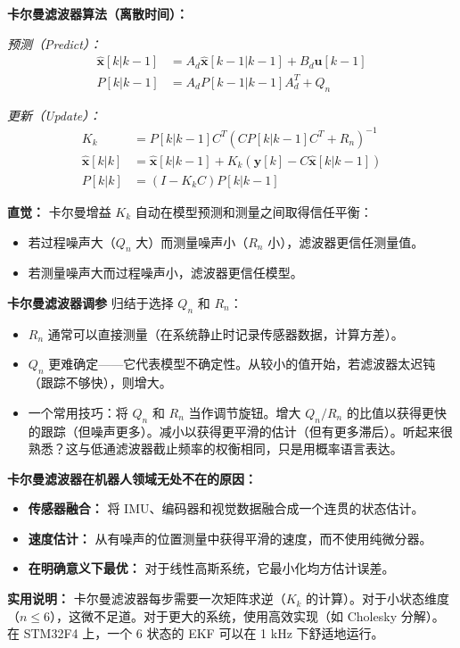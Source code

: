 \textbf{卡尔曼滤波器算法（离散时间）：}

\textit{预测（Predict）：}
\begin{align}
\hat{\mathbf{x}}[k|k-1] &= A_d \hat{\mathbf{x}}[k-1|k-1] + B_d \mathbf{u}[k-1] \\
P[k|k-1] &= A_d P[k-1|k-1] A_d^T + Q_n
\end{align}

\textit{更新（Update）：}
\begin{align}
K_k &= P[k|k-1] C^T (C P[k|k-1] C^T + R_n)^{-1} \\
\hat{\mathbf{x}}[k|k] &= \hat{\mathbf{x}}[k|k-1] + K_k (\mathbf{y}[k] - C \hat{\mathbf{x}}[k|k-1]) \\
P[k|k] &= (I - K_k C) P[k|k-1]
\end{align}

\textbf{直觉：} 卡尔曼增益 $K_k$ 自动在模型预测和测量之间取得信任平衡：
\begin{itemize}
    \item 若过程噪声大（$Q_n$ 大）而测量噪声小（$R_n$ 小），滤波器更信任测量值。
    \item 若测量噪声大而过程噪声小，滤波器更信任模型。
\end{itemize}

\textbf{卡尔曼滤波器调参} 归结于选择 $Q_n$ 和 $R_n$：
\begin{itemize}
    \item $R_n$ 通常可以直接测量（在系统静止时记录传感器数据，计算方差）。
    \item $Q_n$ 更难确定——它代表模型不确定性。从较小的值开始，若滤波器太迟钝（跟踪不够快），则增大。
    \item 一个常用技巧：将 $Q_n$ 和 $R_n$ 当作调节旋钮。增大 $Q_n / R_n$ 的比值以获得更快的跟踪（但噪声更多）。减小以获得更平滑的估计（但有更多滞后）。听起来很熟悉？这与低通滤波器截止频率的权衡相同，只是用概率语言表达。
\end{itemize}

\textbf{卡尔曼滤波器在机器人领域无处不在的原因：}
\begin{itemize}
    \item \textbf{传感器融合：} 将 IMU、编码器和视觉数据融合成一个连贯的状态估计。
    \item \textbf{速度估计：} 从有噪声的位置测量中获得平滑的速度，而不使用纯微分器。
    \item \textbf{在明确意义下最优：} 对于线性高斯系统，它最小化均方估计误差。
\end{itemize}

\textbf{实用说明：} 卡尔曼滤波器每步需要一次矩阵求逆（$K_k$ 的计算）。对于小状态维度（$n \leq 6$），这微不足道。对于更大的系统，使用高效实现（如 Cholesky 分解）。在 STM32F4 上，一个 6 状态的 EKF 可以在 1 kHz 下舒适地运行。

